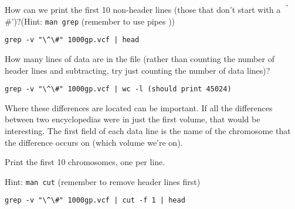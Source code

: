 \begin{questions}
How can we print the first 10 non-header lines (those that don't start with a ｀\#')?(Hint: \texttt{man grep} (remember to use pipes \texttt{\textbar}))
\begin{answer}
\begin{lstlisting}
grep -v "\^\#" 1000gp.vcf | head  
\end{lstlisting}
\end{answer}
\end{questions}

\begin{questions}
How many lines of data are in the file (rather than counting the number of header lines and subtracting, try just counting the number of data lines)? \\
\begin{answer}
\begin{lstlisting}
grep -v "\^\#" 1000gp.vcf | wc -l (should print 45024)
\end{lstlisting}
\end{answer}
\end{questions}

\begin{note}
Where these differences are located can be important. If all the differences between two encyclopedias were in just the first volume, that would be interesting. The first field of each data line is the name of the chromosome that the difference occurs on (which volume we're on). 
\end{note}

\begin{questions}
Print the first 10 chromosomes, one per line. 

Hint: \texttt{man cut} (remember to remove header lines first)
\begin{answer}
\begin{lstlisting}
grep -v "\^\#" 1000gp.vcf | cut -f 1 | head
\end{lstlisting}
\end{answer}
\end{questions}

